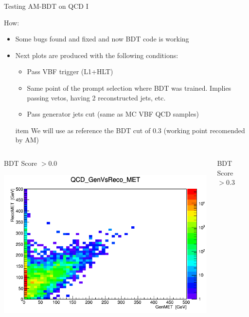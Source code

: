 \documentclass[8pt]{beamer}
\begin{document}
\begin{frame}{Testing AM-BDT on QCD I}
 
\begin{block}{How:}

  \begin{itemize}
    \item Some bugs found and fixed and now BDT code is working
    \item Next plots are produced with the following conditions:
    \begin{itemize}
      \item Pass VBF trigger (L1+HLT)
      \item Same point of the prompt selection where BDT was trained. Implies passing vetos, having 2 reconstructed jets, etc.
      \item Pass generator jets cut (same as MC VBF QCD samples)
    \end{itemize}
     item We will use as reference the BDT cut of 0.3 (working point recomended by AM)
  \end{itemize}

\end{block}

\begin{columns}

\begin{block}{BDT Score $> 0.0$}
 
\centering
\includegraphics[width=\linewidth]{img/BDT0p0_QCD_GenVsReco_MET.png} 
 
\end{block}

\begin{block}{BDT Score $> 0.3$}
 

\end{block}
\end{columns}
\end{frame}
\end{document}
